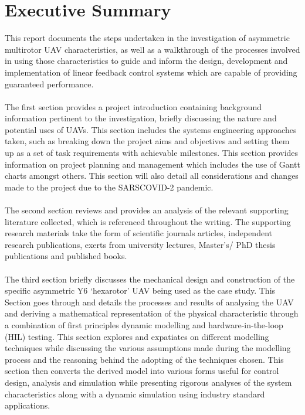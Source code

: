 \documentclass[12pt,a4paper,twoside]{report}
\begin{document}
	\section*{Executive Summary}
		This report documents the steps undertaken in the investigation of asymmetric multirotor UAV characteristics, as well as a walkthrough of the processes involved in using those characteristics to guide and inform the design, development and implementation of linear feedback control systems which are capable of providing guaranteed performance.
		\\ \\
		The first section provides a project introduction containing background information pertinent to the investigation, briefly discussing the nature and potential uses of UAVs. This section includes the systems engineering approaches taken, such as breaking down the project aims and objectives and setting them up as a set of task requirements with achievable milestones. This section provides information on project planning and management which includes the use of Gantt charts amongst others. This section will also detail all considerations and changes made to the project due to the SARSCOVID-2 pandemic.
		\\ \\
		The second section reviews and provides an analysis of the relevant supporting literature collected, which is referenced throughout the writing. The supporting research materials take the form of scientific journals articles, independent research publications, exerts from university lectures, Master’s/ PhD thesis publications and published books.
		\\ \\
		The third section briefly discusses the mechanical design and construction of the specific asymmetric Y6 ‘hexarotor’ UAV being used as the case study. This Section goes through and details the processes and results of analysing the UAV and deriving a mathematical representation of the physical characteristic through a combination of first principles dynamic modelling and hardware-in-the-loop (HIL) testing. This section explores and expatiates on different modelling techniques while discussing the various assumptions made during the modelling process and the reasoning behind the adopting of the techniques chosen. This section then converts the derived model into various forms useful for control design, analysis and simulation while presenting rigorous analyses of the system characteristics along with a dynamic simulation using industry standard applications.
\end{document}
